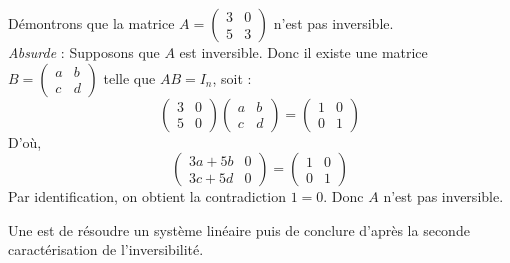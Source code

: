 \documentclass{book}
\begin{document}
\begin{Exemple}
Démontrons que la matrice $A =\begin{pmatrix}
3& 0\\
5 &3\end{pmatrix}$ n'est pas inversible.\\
\textit{Absurde} : Supposons que $A$ est inversible. Donc il existe une matrice $B =\begin{pmatrix}
a& b\\
c &d\end{pmatrix}$ telle que $AB=I_n$, soit :
$$ \begin{pmatrix}
3& 0\\
5 &0\end{pmatrix}\begin{pmatrix}
a& b\\
c &d\end{pmatrix} = \begin{pmatrix}
1& 0\\
0 &1\end{pmatrix}$$
D'où,  
$$\begin{pmatrix}
3a+5b& 0\\
3c+5d &0\end{pmatrix}= \begin{pmatrix}
1& 0\\
0 &1\end{pmatrix}$$
Par identification, on obtient la contradiction $1=0$. Donc $A$ n'est pas inversible.  
\end{Exemple}
Une  est de résoudre un système linéaire puis  de conclure d'après la seconde caractérisation de l'inversibilité.
\end{document}
